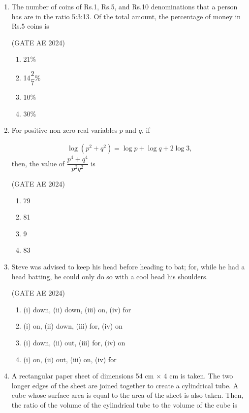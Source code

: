 \documentclass[journal,12pt,onecolumn]{IEEEtran}
\theoremstyle{remark}
\begin{document}
\begin{flushleft}
\begin{enumerate}
\item The number of coins of Rs.1, Rs.5, and Rs.10 denominations that a person has are in the ratio 5:3:13.
Of the total amount, the percentage of money in Rs.5 coins is

\hfill(GATE AE 2024)

\begin{enumerate}
    \item 21\%
    \item 14$\dfrac{2}{7}$\%
    \item 10\% 
    \item 30\%
\end{enumerate}

\item For positive non-zero real variables $p$ and $q$, if 

\begin{align*}
    \log(p^2 + q^2) = \log p + \log q + 2 \log 3,
\end{align*}
then, the value of $\dfrac{p^4 + q^4}{p^2 q^2}$ is 

\hfill(GATE AE 2024)

\begin{enumerate}
    \item  79 
    \item 81 
    \item 9
    \item 83
\end{enumerate}

\item Steve was advised to keep his head \underline{\hspace{1.5cm}} before heading \underline{\hspace{1.5cm}} to bat; for, while he had a head \underline{\hspace{1.5cm}} batting, he could only do so with a cool head \underline{\hspace{1.5cm}} his shoulders. 

\hfill(GATE AE 2024)

\begin{enumerate}
    \item (i) down, (ii) down, (iii) on, (iv) for
    \item (i) on, (ii) down, (iii) for, (iv) on
    \item (i) down, (ii) out, (iii) for, (iv) on
    \item (i) on, (ii) out, (iii) on, (iv) for
\end{enumerate}

\item A rectangular paper sheet of dimensions 54 cm $\times$ 4 cm is taken. The two longer edges of the sheet are joined together to create a cylindrical tube. A cube whose surface area is equal to the area of the sheet is also taken. Then, the ratio of the volume of the cylindrical tube to the volume of the cube is 


\end{enumerate}
\end{flushleft}
\end{document}
